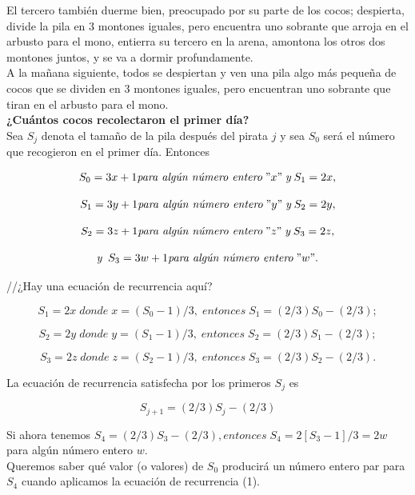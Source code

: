 \documentclass{article}
\begin{document}
El tercero también duerme bien, preocupado por su parte de los cocos; despierta, divide la pila en 3 montones iguales, pero encuentra uno sobrante que arroja en el arbusto para el mono, entierra su tercero en la arena, amontona los otros dos montones juntos, y se va a dormir profundamente.\\

A la mañana siguiente, todos se despiertan y ven una pila algo más pequeña de cocos que se dividen en 3 montones iguales, pero encuentran uno sobrante que tiran en el arbusto para el mono.\\

{\bf ¿Cuántos cocos recolectaron el primer día?}\\

Sea $S_{j}$ denota el tamaño de la pila después del pirata $j$ y sea $S_{0}$ será el número que recogieron en el primer día. Entonces

$$
S_{0} = 3x+1 \textit{para algún número entero}\; "x" \; \textit{y} \; S_1 = 2x,
$$

$$
S_{1} = 3y+1 \textit{para algún número entero}\; "y" \; \textit{y} \; S_2 = 2y,
$$

$$
S_{2} = 3z+1 \textit{para algún número entero}\; "z" \; \textit{y} \; S_3 = 2z,
$$

$$\textit{y} \;\;
S_{3} = 3w+1 \textit{para algún número entero}\; "w".
$$

//¿Hay una ecuación de recurrencia aquí?

$$
S_{1} = 2x \; \textit{donde}\; x=(S_{0}-1)/3, \; \textit{entonces} \; S_{1} = (2/3)S_0 - (2/3);
$$

$$
S_{2} = 2y \; \textit{donde}\; y=(S_{1}-1)/3, \; \textit{entonces} \; S_{2} = (2/3)S_1 - (2/3);
$$

$$
S_{3} = 2z \; \textit{donde}\; z=(S_{2}-1)/3, \; \textit{entonces} \; S_{3} = (2/3)S_2 - (2/3).
$$

La ecuación de recurrencia satisfecha por los primeros $S_{j}$ es

\begin{equation}
    S_{j+1} = (2/3)S_{j} - (2/3)
\end{equation}

Si ahora tenemos $S_{4}=(2/3)S_{3}-(2/3), \textit{entonces} \; S_{4}=2[S_{3}-1]/3 = 2w$ para algún número entero $w$.\\

Queremos saber qué valor (o valores) de $S_0$ producirá un número entero par para $S_4$ cuando aplicamos la ecuación de recurrencia (1).\\
\end{document}
